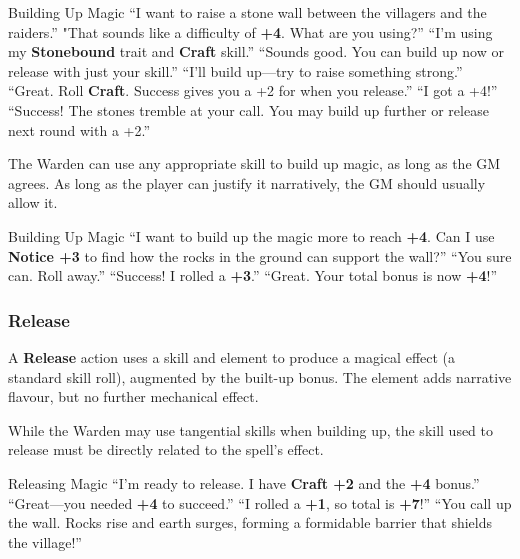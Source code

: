 \begin{ExampleGame}{Building Up Magic}
    \line[Player] “I want to raise a stone wall between the villagers and the raiders.”
    \line[GM]     "That sounds like a difficulty of \textbf{+4}. What are you using?”
    \line[Player] “I’m using my \textbf{Stonebound} trait and \textbf{Craft} skill.”
    \line[GM]     “Sounds good. You can build up now or release with just your skill.”
    \line[Player] “I’ll build up—try to raise something strong.”
    \line[GM]     “Great. Roll \textbf{Craft}. Success gives you a +2 for when you release.”
    \line[Player] “I got a +4!”
    \line[GM]     “Success! The stones tremble at your call. You may build up further or release next round with a +2.”
\end{ExampleGame}

The Warden can use any appropriate skill to build up magic, as long as the GM agrees. As long as the player can justify it narratively, the GM should usually allow it.

\begin{ExampleGame}{Building Up Magic}
    \line[Player] “I want to build up the magic more to reach \textbf{+4}. Can I use \textbf{Notice +3} to find how the rocks in the ground can support the wall?”
    \line[GM]     “You sure can. Roll away.”
    \line[Player] “Success! I rolled a \textbf{+3}.”
    \line[GM]     “Great. Your total bonus is now \textbf{+4}!”
\end{ExampleGame}

\subsubsection{Release}

A \textbf{Release} action uses a skill and element to produce a magical effect (a standard skill roll), augmented by the built-up bonus. The element adds narrative flavour, but no further mechanical effect.

While the Warden may use tangential skills when building up, the skill used to release must be directly related to the spell’s effect.

\begin{ExampleGame}{Releasing Magic}
    \line[Player] “I’m ready to release. I have \textbf{Craft +2} and the \textbf{+4} bonus.”
    \line[GM]     “Great—you needed \textbf{+4} to succeed.”
    \line[Player] “I rolled a \textbf{+1}, so total is \textbf{+7}!”
    \line[GM]     “You call up the wall. Rocks rise and earth surges, forming a formidable barrier that shields the village!”
\end{ExampleGame}

